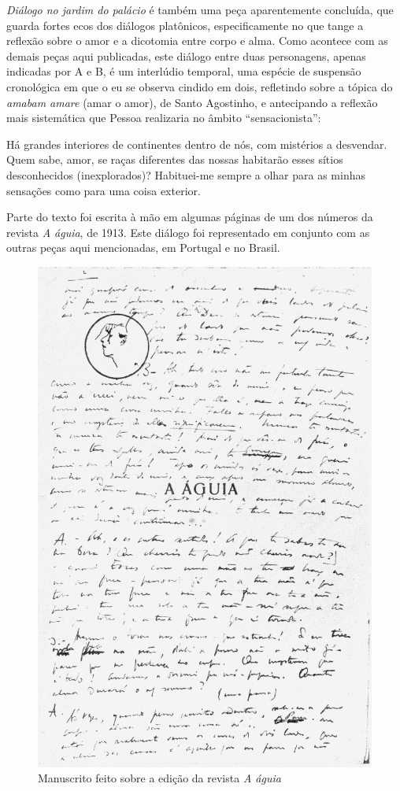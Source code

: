 \textit{Diálogo no jardim do palácio} é também uma peça aparentemente
concluída, que guarda fortes ecos dos diálogos platônicos,
especificamente no que tange a reflexão sobre o amor e a dicotomia
entre corpo e alma. Como acontece com as demais peças aqui publicadas,
este diálogo entre duas personagens, apenas indicadas por A e B, é um
interlúdio temporal, uma espécie de suspensão cronológica em que o eu
se observa cindido em dois, refletindo sobre a tópica do \textit{amabam
amare} (amar o amor), de Santo Agostinho, e antecipando a reflexão mais
sistemática que Pessoa realizaria no âmbito “sensacionista”: 
\begin{hedraquote}
Há grandes interiores de continentes dentro de nós, com mistérios a
desvendar. Quem sabe, amor, se raças diferentes das nossas habitarão
esses sítios desconhecidos (inexplorados)? Habituei-me sempre a olhar
para as minhas sensações como para uma coisa exterior.
\end{hedraquote}

Parte do texto
foi escrita à mão em algumas páginas de um dos números da revista
\textit{A águia}, de 1913. Este diálogo foi representado em conjunto
com as outras peças aqui mencionadas, em Portugal e no Brasil.
\begin{figure}
\includegraphics[width=\textwidth]{4.png}
\caption{Manuscrito feito sobre a edição da revista \emph{A águia}}
\end{figure}

